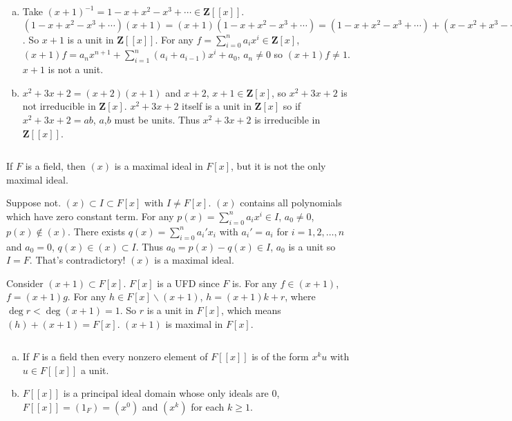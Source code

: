 \begin{answer}
    \begin{enumerate}[(a)]
        \item Take $(x+1)^{-1}=1-x+x^{2}-x^{3}+\cdots\in \mathbf{Z}[[x]]$. $(1-x+x^{2}-x^{3}+\cdots)(x+1)=(x+1)(1-x+x^{2}-x^{3}+\cdots)=(1-x+x^{2}-x^{3}+\cdots)+(x-x^{2}+x^{3}-\cdots)=1$. So $x+1$ is a unit in $\mathbf{Z}[[x]]$. For any $f=\sum\limits_{i=0}^{n}a_{i}x^{i}\in\mathbf{Z}[x]$, $(x+1)f=a_{n}x^{n+1}+\sum\limits_{i=1}^{n}(a_{i}+a_{i-1})x^{i}+a_{0}$, $a_{n}\neq 0$ so $(x+1)f\neq 1$. $x+1$ is not a unit.
        \item $x^{2}+3x+2=(x+2)(x+1)$ and $x+2$, $x+1\in \mathbf{Z}[x]$, so $x^{2}+3x+2$ is not irreducible in $\mathbf{Z}[x]$. $x^{2}+3x+2$ itself is a unit in $\mathbf{Z}[x]$ so if $x^{2}+3x+2=ab$, $a$,$b$ must be units. Thus $x^{2}+3x+2$ is irreducible in $\mathbf{Z}[[x]]$.
    \end{enumerate}
\end{answer}

$$ $$

\begin{ex}
    If $F$ is a field, then $(x)$ is a maximal ideal in $F[x]$, but it is not the only maximal ideal.
\end{ex}

\begin{answer}
    Suppose not. $(x)\subset I\subset F[x]$ with $I\neq F[x]$. $(x)$ contains all polynomials which have zero constant term. For any $p(x)=\sum\limits_{i=0}^{n}a_{i}x^{i}\in I$, $a_{0}\neq 0$, $p(x)\notin (x)$. There exists $q(x)=\sum\limits_{i=0}^{n}a_{i}'x_{i}$ with $a_{i}'=a_{i}$ for $i=1,2,\dots,n$ and $a_{0}=0$, $q(x)\in (x)\subset I$. Thus $a_{0}=p(x)-q(x)\in I$, $a_{0}$ is a unit so $I=F$. That's contradictory! $(x)$ is a maximal ideal.
    
    Consider $(x+1)\subset F[x]$. $F[x]$ is a UFD since $F$ is. For any $f\in (x+1)$, $f=(x+1)g$. For any $h\in F[x]\backslash(x+1)$, $h=(x+1)k+r$, where $\deg r<\deg (x+1)=1$. So $r$ is a unit in $F[x]$, which means $(h)+(x+1)=F[x]$. $(x+1)$ is maximal in $F[x]$.
\end{answer}

$$ $$

\begin{ex}
    \begin{enumerate}[(a)]
        \item If $F$ is a field then every nonzero element of $F[[x]]$ is of the form $x^{k}u$ with $u\in F[[x]]$ a unit.
        \item $F[[x]]$ is a principal ideal domain whose only ideals are 0, $F[[x]]=(1_{F})=(x^{0})$ and $(x^{k})$ for each $k\geq 1$.
    \end{enumerate}
\end{ex}

